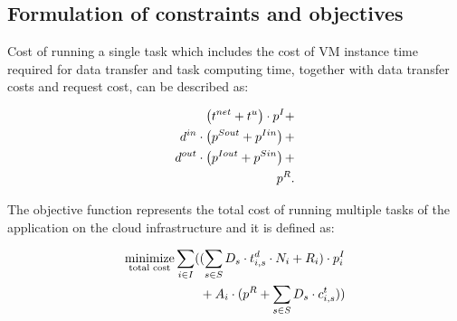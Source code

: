 {\subsection{Formulation of constraints and objectives}

  Cost of running a single task which includes the cost of VM instance time required for data transfer and task computing time, together with data transfer costs and request cost, can be described as: 

  \begin{align*}
      \left(t^{net} + t^u\right) \cdot p^I + \\
      d^{in} \cdot \left(p^{Sout} + p^{Iin}\right) + \\
      d^{out} \cdot \left(p^{Iout} + p^{Sin}\right) + \\
      p^{R}.
  \end{align*}

  The objective function represents the total cost of running multiple tasks of the application on the cloud infrastructure and it is defined as:

  \begin{align}    
  \begin{split}
      \underset{\text{total cost}}{\text{minimize}} \sum \limits_{i \in I}  ( & 
                   (\sum\limits_{s \in S} D_s\cdot t^d_{i,s}\cdot N_i + R_i) \cdot p^I_i \\ 
                   & + A_i\cdot(p^{R} + \sum\limits_{s \in S} D_s \cdot c^t_{i,s})
                 )
  \end{split}
  \end{align}
  
}

